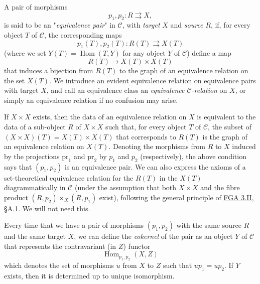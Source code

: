   A pair of morphisms
  \[     p_1,p_2\colon  R\rightrightarrows  X,   \]
  is said to be an "\emph{equivalence pair}" in \(\mathcal {C}\), with \emph{target} \(X\) and \emph{source} \(R\), if, for every object \(T\) of \(\mathcal {C}\), the corresponding maps
  \[     p_1(T),p_2(T)\colon  R(T)\rightrightarrows  X(T)   \]
  (where we set \(Y(T)=\operatorname {Hom}(T,Y)\) for any object \(Y\) of \(\mathcal {C}\)) define a map
  \[     R(T)\to  X(T)\times  X(T)   \]
  that induces a bijection from \(R(T)\) to the graph of an equivalence relation on the set \(X(T)\).
  We introduce an evident equivalence relation on equivalence pairs with target \(X\), and call an equivalence class an \emph{equivalence \(\mathcal {C}\)-relation} on \(X\), or simply an equivalence relation if no confusion may arise.\par{}If \(X\times  X\) exists, then the data of an equivalence relation on \(X\) is equivalent to the data of a sub-object \(R\) of \(X\times  X\) such that, for every object \(T\) of \(\mathcal {C}\), the subset of \((X\times  X)(T)=X(T)\times  X(T)\) that corresponds to \(R(T)\) is the graph of an equivalence relation on \(X(T)\).
  Denoting the morphisms from \(R\) to \(X\) induced by the projections \(\mathrm {pr}_1\) and \(\mathrm {pr}_2\) by \(p_1\) and \(p_2\) (respectively), the above condition says that \((p_1,p_2)\) is an equivalence pair.
  We can also express the axioms of a set-theoretical equivalence relation for the \(R(T)\) in the \(X(T)\) diagrammatically in \(\mathcal {C}\) (under the assumption that both \(X\times  X\) and the fibre product \((R,p_2)\times _X(R,p_1)\) exist), following the general principle of \hyperref[fga3.ii-a.1]{FGA 3.II, §A.1}.
  We will not need this.\par{}Every time that we have a pair of morphisms \((p_1,p_2)\) with the same source \(R\) and the same target \(X\), we can define the \emph{cokernel} of the pair as an object \(Y\) of \(\mathcal {C}\) that represents the contravariant (in \(Z\)) functor
  \[     \operatorname {Hom}_{p_1,p_2}(X,Z)   \]
  which denotes the set of morphisms \(u\) from \(X\) to \(Z\) such that \(up_1=up_2\).
  If \(Y\) exists, then it is determined up to unique isomorphism.
  
